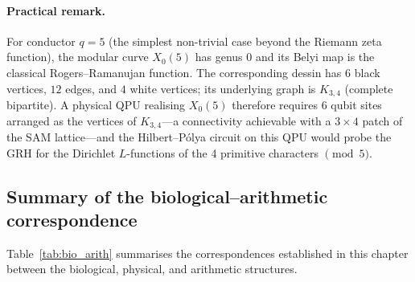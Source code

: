 \documentclass[11pt,oneside]{amsbook}
\numberwithin{equation}{section}
\theoremstyle{plain}
\theoremstyle{definition}
\theoremstyle{remark}
\begin{document}
\paragraph{Practical remark.}  For conductor $q = 5$ (the simplest non-trivial
case beyond the Riemann zeta function), the modular curve $X_0(5)$ has genus
$0$ and its Belyi map is the classical Rogers--Ramanujan function.  The
corresponding dessin has $6$ black vertices, $12$ edges, and $4$ white vertices;
its underlying graph is $K_{3,4}$ (complete bipartite).  A physical QPU
realising $X_0(5)$ therefore requires $6$ qubit sites arranged as the vertices
of $K_{3,4}$---a connectivity achievable with a $3 \times 4$ patch of the SAM
lattice---and the Hilbert--P\'olya circuit on this QPU would probe the GRH for
the Dirichlet $L$-functions of the 4 primitive characters $\pmod{5}$.

\subsection{Summary of the biological--arithmetic correspondence}
\label{subsec:pqpu_summary}

Table~\ref{tab:bio_arith} summarises the correspondences established in this
chapter between the biological, physical, and arithmetic structures.
\end{document}
